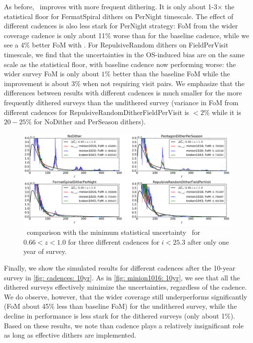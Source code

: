 As before, \sigmaOS\ improves with more frequent dithering. It is only about 1-3$\times$ the statistical floor for FermatSpiral dithers on PerNight timescale. The effect of different cadences is also less stark for PerNight strategy: FoM from the wider coverage cadence is only about 11$\%$ worse than for the baseline cadence, while we see a $4\%$ better FoM with . For RepulsiveRandom dithers on FieldPerVisit timescale, we find that the uncertainties in the OS-induced bias are on the same scale as the statistical floor, with baseline cadence now performing worse: the wider survey FoM is only about $1\%$ better than the baseline FoM while the improvement is about 3$\%$ when not requiring visit pairs. We emphasize that the differences between results with different cadences is much smaller for the more frequently dithered surveys than the undithered survey (variance in FoM from different cadences for RepulsiveRandomDitherFieldPerVisit is $<2\%$ while it is $20-25\%$ for NoDither and PerSeason dithers).

\begin{figure}[!htb]
      \centering\includegraphics[width=\linewidth]{figs/awan_1yr_goldSample_3cadences.pdf}
       \vspace*{-2em}
\caption{\sigmaOS\ comparison with the minimum statistical uncertainty \statFloor\ for $0.66<z<1.0$ for three different cadences for $i<25.3$ after only one year of survey.}
\label{fig: cadences: 1yr}
\end{figure}

Finally, we show the simulated results for different cadences after the 10-year survey in \autoref{fig: cadences: 10yr}. As in \autoref{fig: minion1016: 10yr}, we see that all the dithered surveys effectively minimize the uncertainties, regardless of the cadence. We do observe, however, that the wider coverage  still underperforms significantly (FoM about 45$\%$ less than baseline FoM) for the undithered survey, while the decline in performance is less stark for the dithered surveys (only about 1$\%$). Based on these results, we note than cadence plays a relatively insignificant role as long as effective dithers are implemented.

